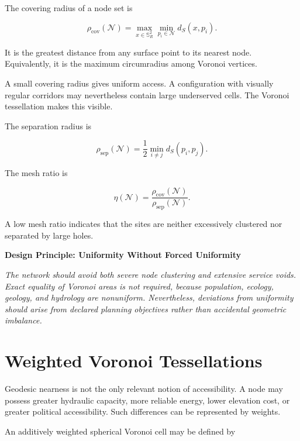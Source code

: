 \documentclass[11pt,fleqn]{book}
\numberwithin{equation}{chapter}
\newenvironment{principle}[1]
  {\begin{principleEnv}
   \noindent\textbf{Design Principle: #1}\par\smallskip\itshape}
  {\end{principleEnv}}
\theoremstyle{plain}
\theoremstyle{definition}
\theoremstyle{remark}
\newcommand{\Sphere}{\mathbb{S}^{2}}
\newcommand{\Nset}{\mathcal{N}}
\begin{document}
The covering radius of a node set is

\begin{equation}
    \rho_{\mathrm{cov}}(\Nset)
    =
    \max_{x\in\Sphere_R}
    \min_{p_i\in\Nset}
    d_S(x,p_i).
\end{equation}

It is the greatest distance from any surface point to its nearest node. Equivalently, it is the maximum circumradius among Voronoi vertices.

A small covering radius gives uniform access. A configuration with visually regular corridors may nevertheless contain large underserved cells. The Voronoi tessellation makes this visible.

The separation radius is

\begin{equation}
    \rho_{\mathrm{sep}}(\Nset)
    =
    \frac{1}{2}
    \min_{i\neq j}
    d_S(p_i,p_j).
\end{equation}

The mesh ratio is

\begin{equation}
    \eta(\Nset)
    =
    \frac{
      \rho_{\mathrm{cov}}(\Nset)
    }{
      \rho_{\mathrm{sep}}(\Nset)
    }.
\end{equation}

A low mesh ratio indicates that the sites are neither excessively clustered nor separated by large holes.

\begin{principle}{Uniformity Without Forced Uniformity}
The network should avoid both severe node clustering and extensive service voids. Exact equality of Voronoi areas is not required, because population, ecology, geology, and hydrology are nonuniform. Nevertheless, deviations from uniformity should arise from declared planning objectives rather than accidental geometric imbalance.
\end{principle}

\section{Weighted Voronoi Tessellations}

Geodesic nearness is not the only relevant notion of accessibility. A node may possess greater hydraulic capacity, more reliable energy, lower elevation cost, or greater political accessibility. Such differences can be represented by weights.

An additively weighted spherical Voronoi cell may be defined by
\end{document}
